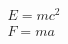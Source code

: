 \documentclass{article}
\begin{document}
 
$$
\begin{array}{c}
E = mc^2 \\
F = ma
\end{array}
$$
\end{document}
